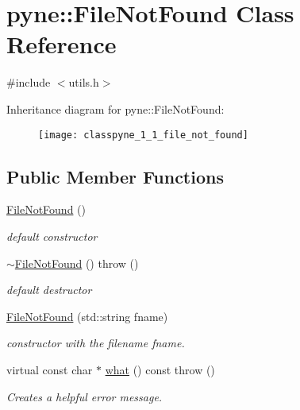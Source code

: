 \hypertarget{classpyne_1_1_file_not_found}{}\section{pyne\+:\+:File\+Not\+Found Class Reference}
\label{classpyne_1_1_file_not_found}


{\ttfamily \#include $<$utils.\+h$>$}

Inheritance diagram for pyne\+:\+:File\+Not\+Found\+:\begin{figure}[H]
\begin{center}
\leavevmode
\texttt{[image: classpyne\_1\_1\_file\_not\_found]}
\end{center}
\end{figure}
\subsection*{Public Member Functions}
\begin{DoxyCompactItemize}
\item 
\mbox{\label{classpyne_1_1_file_not_found_aaae1bdf04df2b68377ae453929c8eb56}} 
\hyperlink{classpyne_1_1_file_not_found_aaae1bdf04df2b68377ae453929c8eb56}{File\+Not\+Found} ()
\begin{DoxyCompactList}\small\item\em default constructor \end{DoxyCompactList}\item 
\mbox{\label{classpyne_1_1_file_not_found_abc00e9c8711bb1b1bb2dc1dfd3a98745}} 
\hyperlink{classpyne_1_1_file_not_found_abc00e9c8711bb1b1bb2dc1dfd3a98745}{$\sim$\+File\+Not\+Found} ()  throw ()
\begin{DoxyCompactList}\small\item\em default destructor \end{DoxyCompactList}\item 
\mbox{\label{classpyne_1_1_file_not_found_a4d766115c01634b77aebe42269f9aead}} 
\hyperlink{classpyne_1_1_file_not_found_a4d766115c01634b77aebe42269f9aead}{File\+Not\+Found} (std\+::string fname)
\begin{DoxyCompactList}\small\item\em constructor with the filename {\itshape fname}. \end{DoxyCompactList}\item 
\mbox{\label{classpyne_1_1_file_not_found_a71e319e330fc7766264cf76a3f8ee529}} 
virtual const char $\ast$ \hyperlink{classpyne_1_1_file_not_found_a71e319e330fc7766264cf76a3f8ee529}{what} () const  throw ()
\begin{DoxyCompactList}\small\item\em Creates a helpful error message. \end{DoxyCompactList}\end{DoxyCompactItemize}


